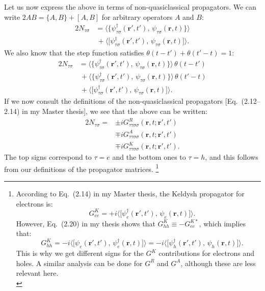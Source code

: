 Let us now express the above in terms of non-quasiclassical propagators.
We can write $2AB = \{A, B\} + [A, B]$ for arbitrary operators $A$ and $B$:
\begin{equation}
\begin{aligned}
  2N_{\tau\sigma}
  &=   \big\langle \big\{ \psi_{\tau\sigma}^\dagger(\bm{r}',t'),\, \psi_{\tau\sigma}^{\phantom{\dagger}}(\bm{r},t) \big\} \big\rangle \\
  &\,+ \big\langle \big[  \psi_{\tau\sigma}^\dagger(\bm{r}',t'),\, \psi_{\tau\sigma}^{\phantom{\dagger}}(\bm{r},t) \big]  \big\rangle. 
\end{aligned}
\end{equation}
We also know that the step function satisfies $\theta(t-t') + \theta(t'-t) = 1$:
\begin{equation}
\begin{aligned}
  2N_{\tau\sigma}
  &=   \big\langle \big\{ \psi_{\tau\sigma}^\dagger(\bm{r}',t'),\, \psi_{\tau\sigma}^{\phantom{\dagger}}(\bm{r},t) \big\} \big\rangle \,\theta(t-t') \\
  &\,+ \big\langle \big\{ \psi_{\tau\sigma}^\dagger(\bm{r}',t'),\, \psi_{\tau\sigma}^{\phantom{\dagger}}(\bm{r},t) \big\} \big\rangle \,\theta(t'-t) \\
  &\,+ \big\langle \big[  \psi_{\tau\sigma}^\dagger(\bm{r}',t'),\, \psi_{\tau\sigma}^{\phantom{\dagger}}(\bm{r},t) \big]  \big\rangle. 
\end{aligned}
\end{equation}
If we now consult the definitions of the non-quasiclassical propagators [Eq.~(2.12--2.14) in my Master thesis], we see that the above can be written:
\begin{equation}
\begin{aligned}
  2N_{\tau\sigma}
   =& \pm i G^R_{\tau\tau\sigma\sigma}(\bm{r}, t; \bm{r}', t') \\
    & \mp i G^A_{\tau\tau\sigma\sigma}(\bm{r}, t; \bm{r}', t') \\
    & \mp i G^K_{\tau\tau\sigma\sigma}(\bm{r}, t; \bm{r}', t') .
\end{aligned}
\end{equation}
The top signs correspond to $\tau = e$ and the bottom ones to $\tau = h$, and this follows from our definitions of the propagator matrices.%
\footnote{According to Eq.~(2.14) in my Master thesis, the Keldysh propagator for electrons is:
  \begin{equation} \quad G^K_{ee} = +i\big\langle \big[\psi_e^{\dagger}(\bm{r}',t'),\,\psi_e^{\phantom\dagger}(\bm{r},t) \big] \big\rangle. \end{equation}
  However, Eq.~(2.20) in my thesis shows that $G^K_{hh} \equiv -G^{K\ast}_{ee}$, which implies that:
  \begin{equation} \quad G^K_{hh} = -i\big\langle \big[\psi_e^{\phantom\dagger}(\bm{r}',t'),\,\psi_e^{\dagger}(\bm{r},t) \big] \big\rangle = -i\big\langle \big[\psi_h^{\dagger}(\bm{r}',t'),\,\psi_h^{\phantom\dagger}(\bm{r},t) \big] \big\rangle. \end{equation}
  This is why we get different signs for the $G^K$ contributions for electrons and holes. 
  A similar analysis can be done for $G^R$ and $G^A$, although these are less relevant here.\\[1ex]}
